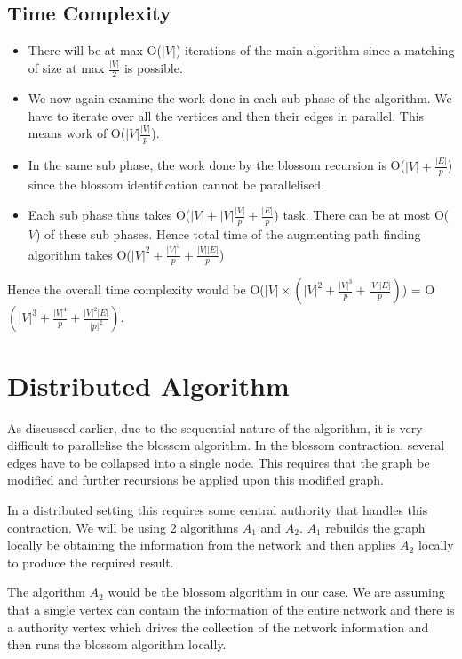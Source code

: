 \subsection{Time Complexity}
\begin{itemize}
    \item There will be at max O($|V|$) iterations of the main algorithm since a matching of size at max $\frac{|V|}{2}$ is possible.
    \item We now again examine the work done in each sub phase of the algorithm. We have to iterate over all the vertices and then their edges in parallel. This means work of O($|V|\frac{|V|}{p}$).
    \item In the same sub phase, the work done by the blossom recursion is O($|V|+\frac{|E|}{p}$) since the blossom identification cannot be parallelised.
    \item Each sub phase thus takes O($|V|+|V|\frac{|V|}{p} + \frac{|E|}{p}$) task. There can be at most O($V$) of these sub phases. Hence total time of the augmenting path finding algorithm takes O($|V|^2 + \frac{|V|^3}{p} + \frac{|V||E|}{p}$)
\end{itemize}
Hence the overall time complexity would be O($|V| \times (|V|^2 + \frac{|V|^3}{p} + \frac{|V||E|}{p})$) = O$(|V|^3 + \frac{|V|^4}{p} + \frac{|V|^2|E|}{|p|^2})$.

\section{Distributed Algorithm}
As discussed earlier, due to the sequential nature of the algorithm, it is very difficult to parallelise the blossom algorithm. In the blossom contraction, several edges have to be collapsed into a single node. This requires that the graph be modified and further recursions be applied upon this modified graph. 

In a distributed setting this requires some central authority that handles this contraction. We will be using 2 algorithms $A_1$ and $A_2$. $A_1$ rebuilds the graph locally be obtaining the information from the network and then applies $A_2$ locally to produce the required result. 

The algorithm $A_2$ would be the blossom algorithm in our case. We are assuming that a single vertex can contain the information of the entire network and there is a authority vertex which drives the collection of the network information and then runs the blossom algorithm locally.


